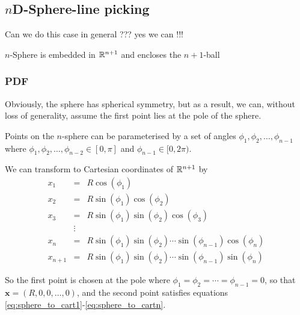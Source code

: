 \subsection{$n$D-Sphere-line picking}
\label{sec:nsphere_line}

Can we do this case in general ??? yes we can !!!

$n$-Sphere is embedded in $\mathbb{R}^{n+1}$ and encloses the $n+1$-ball

\subsubsection{PDF}

Obviously, the sphere has spherical symmetry, but as a result, we can,
without loss of generality, assume the first point lies at the pole of
the sphere.

Points on the $n$-sphere can be parameterised by a set of angles
$\phi_1, \phi_2, \ldots, \phi_{n-1}$ where $\phi_1, \phi_2, \ldots,
\phi_{n-2}\in [0,\pi]$ and $\phi_{n-1}\in [0,2\pi)$. 


We can transform to Cartesian coordinates of $\mathbb{R}^{n+1}$ by
\begin{eqnarray}
  \label{eq:sphere_to_cart1}
  x_1 & = & R \cos (\phi_1 ) \\
  x_2 & = & R \sin(\phi_1) \cos (\phi_2 ) \\
  x_3 & = & R \sin(\phi_1) \sin(\phi_2) \cos (\phi_3 ) \\
      & \vdots & \\
  x_{n} & = & R \sin (\phi_1) \sin(\phi_2) \cdots \sin (\phi_{n-1}) \cos (\phi_{n})  \\
  x_{n+1} & = & R \sin (\phi_1) \sin(\phi_2) \cdots \sin (\phi_{n-1}) \sin (\phi_{n}) 
  \label{eq:sphere_to_cartn}
\end{eqnarray}

So the first point is chosen at the pole where
$\phi_1=\phi_2=\cdots=\phi_{n-1}=0$, so that ${\mathbf x} =
(R,0,0,\ldots,0)$, and the second point satisfies equations
\eqref{eq:sphere_to_cart1}-\eqref{eq:sphere_to_cartn}. 

